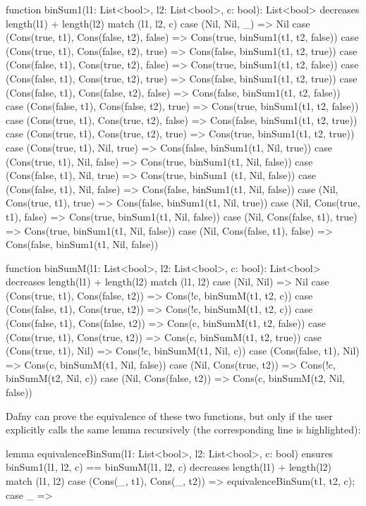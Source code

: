 \begin{dafny}
function binSum1(l1: List<bool>, l2: List<bool>, c: bool): List<bool>
  decreases length(l1) + length(l2)
{
  match (l1, l2, c)
    case (Nil, Nil, _) => Nil
    case (Cons(true, t1), Cons(false, t2), false) => Cons(true, binSum1(t1, t2, false))
    case (Cons(true, t1), Cons(false, t2), true) => Cons(false, binSum1(t1, t2, true))
    case (Cons(false, t1), Cons(true, t2), false) => Cons(true, binSum1(t1, t2, false))
    case (Cons(false, t1), Cons(true, t2), true) => Cons(false, binSum1(t1, t2, true))
    case (Cons(false, t1), Cons(false, t2), false) => Cons(false, binSum1(t1, t2, false))
    case (Cons(false, t1), Cons(false, t2), true) => Cons(true, binSum1(t1, t2, false))
    case (Cons(true, t1), Cons(true, t2), false) => Cons(false, binSum1(t1, t2, true))
    case (Cons(true, t1), Cons(true, t2), true) => Cons(true, binSum1(t1, t2, true))
    case (Cons(true, t1), Nil, true) => Cons(false, binSum1(t1, Nil, true))
    case (Cons(true, t1), Nil, false) => Cons(true, binSum1(t1, Nil, false))
    case (Cons(false, t1), Nil, true) => Cons(true, binSum1 (t1, Nil, false))
    case (Cons(false, t1), Nil, false) => Cons(false, binSum1(t1, Nil, false))
    case (Nil, Cons(true, t1), true) => Cons(false, binSum1(t1, Nil, true))
    case (Nil, Cons(true, t1), false) => Cons(true, binSum1(t1, Nil, false))
    case (Nil, Cons(false, t1), true) => Cons(true, binSum1(t1, Nil, false))
    case (Nil, Cons(false, t1), false) => Cons(false, binSum1(t1, Nil, false))
}

function binSumM(l1: List<bool>, l2: List<bool>, c: bool): List<bool>
  decreases length(l1) + length(l2)
{
  match (l1, l2)
    case (Nil, Nil) => Nil
    case (Cons(true, t1), Cons(false, t2)) => Cons(!c, binSumM(t1, t2, c))
    case (Cons(false, t1), Cons(true, t2)) => Cons(!c, binSumM(t1, t2, c))
    case (Cons(false, t1), Cons(false, t2)) => Cons(c, binSumM(t1, t2, false))
    case (Cons(true, t1), Cons(true, t2)) => Cons(c, binSumM(t1, t2, true))
    case (Cons(true, t1), Nil) => Cons(!c, binSumM(t1, Nil, c))
    case (Cons(false, t1), Nil) => Cons(c, binSumM(t1, Nil, false))
    case (Nil, Cons(true, t2)) => Cons(!c, binSumM(t2, Nil, c))
    case (Nil, Cons(false, t2)) => Cons(c, binSumM(t2, Nil, false))
}
\end{dafny}
%

Dafny can prove the equivalence of these two functions, but only if the user explicitly calls the same lemma recursively (the corresponding line is highlighted):
\begin{dafny}[highlightlines=6]
lemma equivalenceBinSum(l1: List<bool>, l2: List<bool>, c: bool)
  ensures binSum1(l1, l2, c) == binSumM(l1, l2, c)
  decreases length(l1) + length(l2)
{
  match (l1, l2)
    case (Cons(_, t1), Cons(_, t2)) => equivalenceBinSum(t1, t2, c);
    case _ => 
}
\end{dafny}


